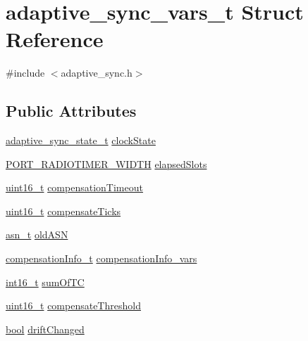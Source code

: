 \hypertarget{structadaptive__sync__vars__t}{}\section{adaptive\+\_\+sync\+\_\+vars\+\_\+t Struct Reference}
\label{structadaptive__sync__vars__t}


{\ttfamily \#include $<$adaptive\+\_\+sync.\+h$>$}

\subsection*{Public Attributes}
\begin{DoxyCompactItemize}
\item 
\hyperlink{group__adpativesync_gac81060fb836128f6649b1249f2eca999}{adaptive\+\_\+sync\+\_\+state\+\_\+t} \hyperlink{structadaptive__sync__vars__t_a03b60b176b1c36cef8973c0809475b8c}{clock\+State}
\item 
\hyperlink{z1_2board__info_8h_ac16e02aadd749b2d27638bed1a805a59}{P\+O\+R\+T\+\_\+\+R\+A\+D\+I\+O\+T\+I\+M\+E\+R\+\_\+\+W\+I\+D\+TH} \hyperlink{structadaptive__sync__vars__t_aac84585b1d30f513f9c66c6a5562a35a}{elapsed\+Slots}
\item 
\hyperlink{_p_e___types_8h_a1f1825b69244eb3ad2c7165ddc99c956}{uint16\+\_\+t} \hyperlink{structadaptive__sync__vars__t_a1c242b99115c32823b4b137171193a24}{compensation\+Timeout}
\item 
\hyperlink{_p_e___types_8h_a1f1825b69244eb3ad2c7165ddc99c956}{uint16\+\_\+t} \hyperlink{structadaptive__sync__vars__t_a72004ac5906fa534177c6e3af8c7d42c}{compensate\+Ticks}
\item 
\hyperlink{structasn__t}{asn\+\_\+t} \hyperlink{structadaptive__sync__vars__t_a40b6e391a347fcbc4aea2c79e358f925}{old\+A\+SN}
\item 
\hyperlink{structcompensation_info__t}{compensation\+Info\+\_\+t} \hyperlink{structadaptive__sync__vars__t_a103352613ccf5aa01aabd6060ad8a2e4}{compensation\+Info\+\_\+vars}
\item 
\hyperlink{_p_e___types_8h_a932e6ccc3d54c58f761c1aead83bd6d7}{int16\+\_\+t} \hyperlink{structadaptive__sync__vars__t_a6a94083f386c91f828fc8ba347dda350}{sum\+Of\+TC}
\item 
\hyperlink{_p_e___types_8h_a1f1825b69244eb3ad2c7165ddc99c956}{uint16\+\_\+t} \hyperlink{structadaptive__sync__vars__t_aa909a2de7eb3c6c5c2e1a985c1ab9c3d}{compensate\+Threshold}
\item 
\hyperlink{_p_e___types_8h_a97a80ca1602ebf2303258971a2c938e2}{bool} \hyperlink{structadaptive__sync__vars__t_a242cc31b23a954e937a22d82570b10b8}{drift\+Changed}
\end{DoxyCompactItemize}


